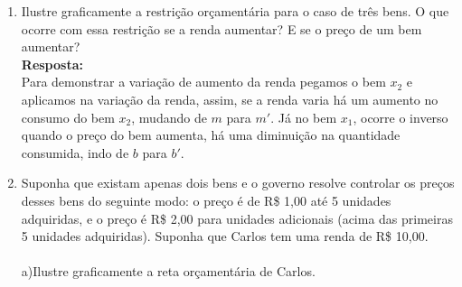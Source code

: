 \begin{enumerate}
\item Ilustre graﬁcamente a restrição orçamentária para o caso de três bens. O que ocorre com essa restrição se a renda aumentar? E se o preço de um bem aumentar?
\\

\textbf{Resposta:}\\

Para demonstrar a variação de aumento da renda pegamos o bem {$x_2$} e aplicamos na variação da renda, assim, se a renda varia há um aumento no consumo do bem {$x_2$}, mudando de {$m$} para {$m'$}. Já no bem {$x_1$}, ocorre o inverso quando o preço do bem aumenta, há uma diminuição na quantidade consumida, indo de {$b$} para {$b'$}.

\begin{center}

\end{center}
\item Suponha que existam apenas dois bens e o governo resolve controlar os preços desses bens do seguinte modo: o preço é de R\$ 1,00 até 5 unidades adquiridas, e o preço é R\$ 2,00 para unidades adicionais (acima das primeiras 5 unidades adquiridas). Suponha que Carlos tem uma renda de R\$ 10,00.
\\


\paragraph{} a)Ilustre graﬁcamente a reta orçamentária de Carlos.\\


\end{enumerate}
